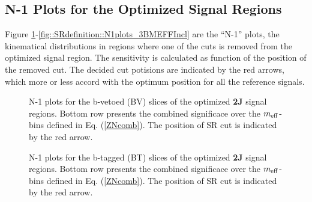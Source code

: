 \clearpage
\subsection{N-1 Plots for the Optimized Signal Regions} \label{sec::Appendix::N1plots}
Figure \ref{fig::SRdefinition::N1plots_2JMEFFInclBV}-\ref{fig::SRdefinition::N1plots_3BMEFFIncl} are the ``N-1'' plots, the kinematical distributions in regions where one of the cuts is removed from the optimized signal region. 
The sensitivity is calculated as function of the position of the removed cut. 
The decided cut potisions are indicated by the red arrows, which more or less accord with the optimum position for all the reference signals.


\begin{figure}[h]
  \centering
    \caption{ 
    N-1 plots for the b-vetoed (BV) slices of the optimized \textbf{2J} signal regions.
    Bottom row presents the combined significace over the $m_{\mathrm{eff}}$-bins defined in Eq. (\ref{ZNcomb}). The position of SR cut is indicated by the red arrow.
    \label{fig::SRdefinition::N1plots_2JMEFFInclBV}
    }
\end{figure}
 

\clearpage
\begin{figure}[h]
  \centering
    \caption{ 
    N-1 plots for the b-tagged (BT) slices of the optimized \textbf{2J} signal regions.
    Bottom row presents the combined significace over the $m_{\mathrm{eff}}$-bins defined in Eq. (\ref{ZNcomb}). The position of SR cut is indicated by the red arrow.
    \label{fig::SRdefinition::N1plots_2JMEFFInclBT}        
    }
\end{figure}
 

